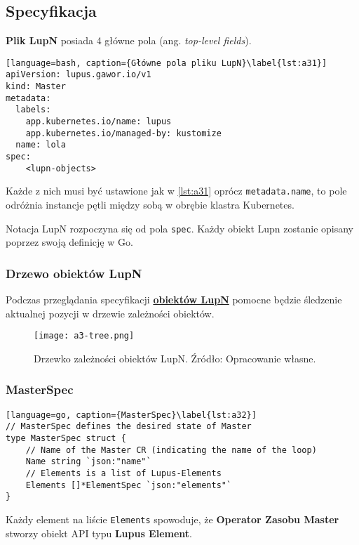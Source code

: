 \subsection{Specyfikacja}

\textbf{Plik LupN} posiada 4 główne pola (ang. \textit{top-level fields}).

\begin{lstlisting}[language=bash, caption={Główne pola pliku LupN}\label{lst:a31}]
apiVersion: lupus.gawor.io/v1
kind: Master
metadata:
  labels:
    app.kubernetes.io/name: lupus
    app.kubernetes.io/managed-by: kustomize
  name: lola
spec:
	<lupn-objects>
\end{lstlisting}

Każde z nich musi być ustawione jak w \ref{lst:a31} oprócz \texttt{metadata.name}, to pole odróżnia instancje pętli między sobą w obrębie klastra Kubernetes.

Notacja LupN rozpoczyna się od pola \texttt{spec}. Każdy obiekt Lupn zostanie opisany poprzez swoją definicję w Go.

\subsubsection{Drzewo obiektów LupN}

Podczas przeglądania specyfikacji \hyperlink{def:obiekt-lupn}{\textbf{obiektów LupN}} pomocne będzie śledzenie aktualnej pozycji w drzewie zależności obiektów. 

\begin{figure}[!h]
    \centering \texttt{[image: a3-tree.png]}
    \caption{Drzewko zależności obiektów LupN. Źródło: Opracowanie własne.}\label{fig:a3-tree}
\end{figure}

\subsubsection{MasterSpec}
\begin{lstlisting}[language=go, caption={MasterSpec}\label{lst:a32}]
// MasterSpec defines the desired state of Master
type MasterSpec struct {
	// Name of the Master CR (indicating the name of the loop)
	Name string `json:"name"`
	// Elements is a list of Lupus-Elements
	Elements []*ElementSpec `json:"elements"`
}
\end{lstlisting}
Każdy element na liście \texttt{Elements} spowoduje, że \textbf{Operator Zasobu Master} stworzy obiekt API typu \textbf{Lupus Element}. 

